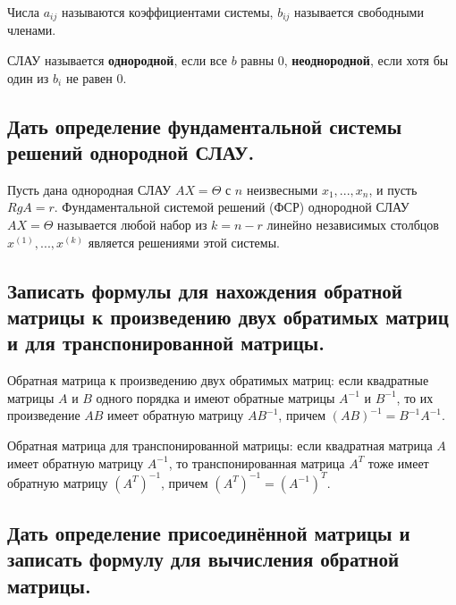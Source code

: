 
Числа $a_{ij}$ называются коэффициентами системы,
$b_{ij}$ называется свободными членами.

СЛАУ называется {\bf{однородной}}, если все $b$ равны $0$, {\bf{неоднородной}}, если хотя бы один из $b_i$ не равен $0$.

\subsection{Дать определение фундаментальной системы решений однородной СЛАУ.}

Пусть дана однородная СЛАУ $AX = \Theta$ с $n$ неизвесными $x_1, ..., x_n$, и пусть $RgA = r$. Фундаментальной системой решений (ФСР) однородной СЛАУ $AX = \Theta$ называется любой набор из $k = n - r$ линейно независимых столбцов $x^{(1)}, ..., x^{(k)}$ является решениями этой системы.

\subsection{Записать формулы для нахождения обратной матрицы к произведению двух обратимых матриц и для транспонированной матрицы.}

Обратная матрица к произведению двух обратимых матриц: если квадратные матрицы $A$ и $B$ одного порядка и имеют обратные матрицы $A^{-1}$ и $B^{-1}$, то их произведение $AB$ имеет обратную матрицу $AB^{-1}$, причем $(AB)^{-1} = B^{-1}A^{-1}$.

\vspace*{15pt}

Обратная матрица для транспонированной матрицы: если квадратная матрица $A$ имеет обратную матрицу $A^{-1}$, то транспонированная матрица $A^T$ тоже имеет обратную матрицу $(A^T)^{-1}$, причем $(A^T)^{-1} = (A^{-1})^T$.

\subsection{Дать определение присоединённой матрицы и записать формулу для вычисления обратной матрицы.}

